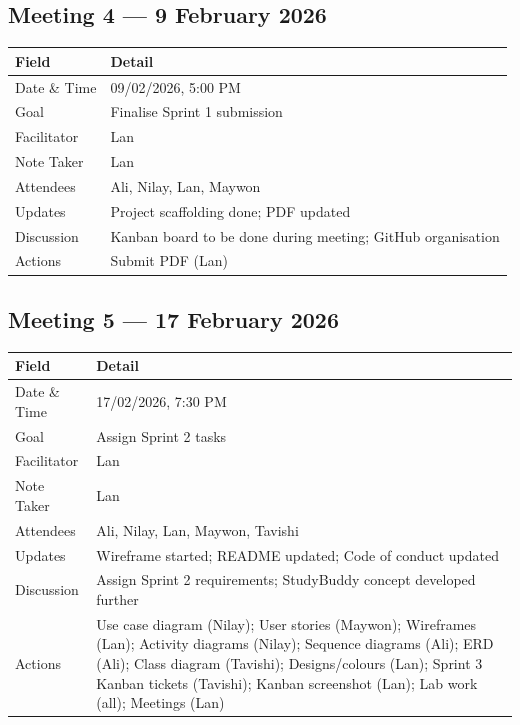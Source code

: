 \documentclass[11pt,a4paper]{article}
\begin{document}
\subsection{Meeting 4 — 9 February 2026}
\begin{table}[H]
\centering
\begin{tabularx}{\textwidth}{lX}
    \toprule
    \textbf{Field} & \textbf{Detail} \\
    \midrule
    Date \& Time    & 09/02/2026, 5:00 PM \\
    Goal            & Finalise Sprint 1 submission \\
    Facilitator     & Lan \\
    Note Taker      & Lan \\
    Attendees       & Ali, Nilay, Lan, Maywon \\
    \midrule
    Updates         & Project scaffolding done; PDF updated \\
    Discussion      & Kanban board to be done during meeting; GitHub organisation \\
    Actions         & Submit PDF (Lan) \\
    \bottomrule
\end{tabularx}
\end{table}

\subsection{Meeting 5 — 17 February 2026}
\begin{table}[H]
\centering
\begin{tabularx}{\textwidth}{lX}
    \toprule
    \textbf{Field} & \textbf{Detail} \\
    \midrule
    Date \& Time    & 17/02/2026, 7:30 PM \\
    Goal            & Assign Sprint 2 tasks \\
    Facilitator     & Lan \\
    Note Taker      & Lan \\
    Attendees       & Ali, Nilay, Lan, Maywon, Tavishi \\
    \midrule
    Updates         & Wireframe started; README updated; Code of conduct updated \\
    Discussion      & Assign Sprint 2 requirements; StudyBuddy concept developed further \\
    Actions         & Use case diagram (Nilay); User stories (Maywon); Wireframes (Lan); Activity diagrams (Nilay); Sequence diagrams (Ali); ERD (Ali); Class diagram (Tavishi); Designs/colours (Lan); Sprint 3 Kanban tickets (Tavishi); Kanban screenshot (Lan); Lab work (all); Meetings (Lan) \\
    \bottomrule
\end{tabularx}
\end{table}
\end{document}
